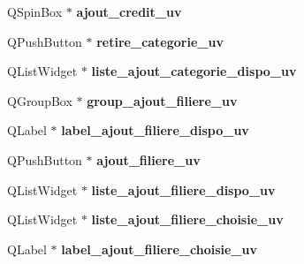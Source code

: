 \begin{DoxyCompactItemize}
\item 
\hypertarget{class_ui___administration_a706b48f017056ca88b4dec42aa34afdc}{Q\+Spin\+Box $\ast$ {\bfseries ajout\+\_\+credit\+\_\+uv}}\label{class_ui___administration_a706b48f017056ca88b4dec42aa34afdc}

\item 
\hypertarget{class_ui___administration_ae40405945047e71ccfa0790d7a177074}{Q\+Push\+Button $\ast$ {\bfseries retire\+\_\+categorie\+\_\+uv}}\label{class_ui___administration_ae40405945047e71ccfa0790d7a177074}

\item 
\hypertarget{class_ui___administration_a0f65b45d2b94a43e6af2649f2cd8ff5f}{Q\+List\+Widget $\ast$ {\bfseries liste\+\_\+ajout\+\_\+categorie\+\_\+dispo\+\_\+uv}}\label{class_ui___administration_a0f65b45d2b94a43e6af2649f2cd8ff5f}

\item 
\hypertarget{class_ui___administration_a9dd961b0085d5b052dc68994aee707d9}{Q\+Group\+Box $\ast$ {\bfseries group\+\_\+ajout\+\_\+filiere\+\_\+uv}}\label{class_ui___administration_a9dd961b0085d5b052dc68994aee707d9}

\item 
\hypertarget{class_ui___administration_a5bdb609c3cdbdc931b8ff950ec34fa36}{Q\+Label $\ast$ {\bfseries label\+\_\+ajout\+\_\+filiere\+\_\+dispo\+\_\+uv}}\label{class_ui___administration_a5bdb609c3cdbdc931b8ff950ec34fa36}

\item 
\hypertarget{class_ui___administration_a059665f26805da91ea5faec5810f3247}{Q\+Push\+Button $\ast$ {\bfseries ajout\+\_\+filiere\+\_\+uv}}\label{class_ui___administration_a059665f26805da91ea5faec5810f3247}

\item 
\hypertarget{class_ui___administration_a7f83feb7a28c3812d3cd0eadbb7cd709}{Q\+List\+Widget $\ast$ {\bfseries liste\+\_\+ajout\+\_\+filiere\+\_\+dispo\+\_\+uv}}\label{class_ui___administration_a7f83feb7a28c3812d3cd0eadbb7cd709}

\item 
\hypertarget{class_ui___administration_abeb653783b448abc941ec3c4b681e682}{Q\+List\+Widget $\ast$ {\bfseries liste\+\_\+ajout\+\_\+filiere\+\_\+choisie\+\_\+uv}}\label{class_ui___administration_abeb653783b448abc941ec3c4b681e682}

\item 
\hypertarget{class_ui___administration_a58089f73544db0a44fcce3e849ccd842}{Q\+Label $\ast$ {\bfseries label\+\_\+ajout\+\_\+filiere\+\_\+choisie\+\_\+uv}}\label{class_ui___administration_a58089f73544db0a44fcce3e849ccd842}


\end{DoxyCompactItemize}
